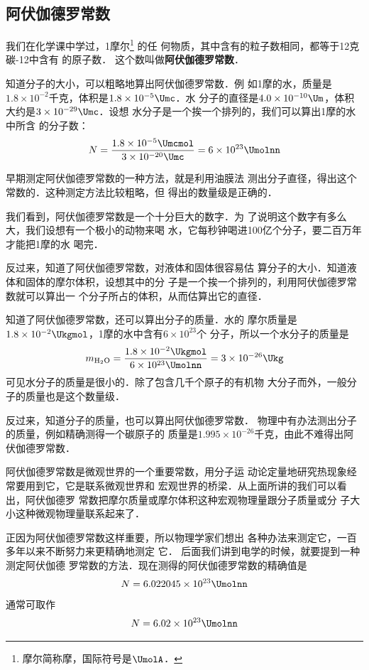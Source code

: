 \subsection{阿伏伽德罗常数}

我们在化学课中学过，1摩尔\footnote{摩尔简称摩，国际符号是$\UmolA$．}
的任
何物质，其中含有的粒子数相同，都等于12克碳-12中含有
的原子数．
这个数叫做\textbf{阿伏伽德罗常数}．

    知道分子的大小，可以粗略地算出阿伏伽德罗常数．例
如1摩的水，质量是$1.8\times 10^{-2}$千克，体积是$1.8\times 10^{-5} \Umc $．水
分子的直径是$4.0\times 10^{-10} \Um $，体积大约是$3\times 10^{-29} \Umc $．设想
水分子是一个挨一个排列的，我们可以算出1摩的水中所含
的分子数：
\[N=\frac{1.8\times 10^{-5} \Umcmol }{3\times 10^{-20} \Umc }=6\times 10^{23} \Umolnn \]

    早期测定阿伏伽德罗常数的一种方法，就是利用油膜法
测出分子直径，得出这个常数的．这种测定方法比较粗略，但
得出的数量级是正确的．

    我们看到，阿伏伽德罗常数是一个十分巨大的数字．为
了说明这个数字有多么大，我们设想有一个极小的动物来喝
水，它每秒钟喝进100亿个分子，要二百万年才能把1摩的水
喝完．

    反过来，知道了阿伏伽德罗常数，对液体和固体很容易估
算分子的大小．知道液体和固体的摩尔体积，设想其中的分
子是一个挨一个排列的，利用阿伏伽德罗常数就可以算出一
个分子所占的体积，从而估算出它的直径．

    知道了阿伏伽德罗常数，还可以算出分子的质量．水的
摩尔质量是$1.8\times 10^{-2} \Ukgmol $，1摩的水中含有$6\times 10^{23}$个
分子，所以一个水分子的质量是
\[m_{\rm H_2 O}=\frac{1.8\times 10^{-2}  \Ukgmol }{6\times 10^{23} \Umolnn }=3\times 10^{-26} \Ukg \]
可见水分子的质量是很小的．除了包含几千个原子的有机物
大分子而外，一般分子的质量也是这个数量级．

    反过来，知道分子的质量，也可以算出阿伏伽德罗常数．
物理中有办法测出分子的质量，例如精确测得一个碳原子的
质量是$1.995\times 10^{-26}$千克，由此不难得出阿伏伽德罗常数．

    阿伏伽德罗常数是微观世界的一个重要常数，用分子运
动论定量地研究热现象经常要用到它，它是联系微观世界和
宏观世界的桥梁．从上面所讲的我们可以看出，阿伏伽德罗
常数把摩尔质量或摩尔体积这种宏观物理量跟分子质量或分
子大小这种微观物理量联系起来了．

    正因为阿伏伽德罗常数这样重要，所以物理学家们想出
各种办法来测定它，一百多年以来不断努力来更精确地测定
它．
后面我们讲到电学的时候，就要提到一种测定阿伏伽德
罗常数的方法．现在测得的阿伏伽德罗常数的精确值是
\[N=6.022045\times 10^{23} \Umolnn \]
通常可取作
\[N=6.02\times 10^{23} \Umolnn \]


